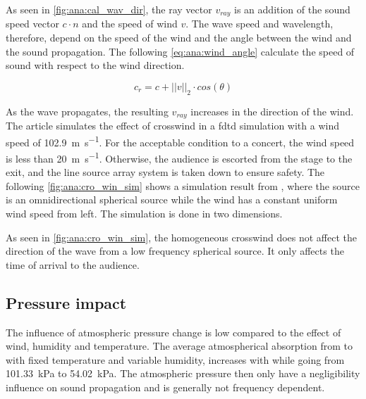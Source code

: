 As seen in \autoref{fig:ana:cal_wav_dir}, the ray vector $v_{ray}$ is an addition of the sound speed vector $c \cdot n$ and the speed of wind $v$. The wave speed and wavelength, therefore, depend on the speed of the wind and the angle between the wind and the sound propagation. The following \autoref{eq:ana:wind_angle} calculate the speed of sound with respect to the wind direction.




\begin{equation}\label{eq:ana:wind_angle}
c_r = c+||v||_2 \cdot cos(\theta) 
\end{equation}


\startexplain
{}
\stopexplain



As the wave propagates, the resulting $v_{ray}$ increases in the direction of the wind. The article \citep{crosswind_simulation} simulates the effect of crosswind in a \gls{fdtd} simulation with a wind speed of \SI{102.9}{\meter\per\second}. For the acceptable condition to a concert, the wind speed is less than \SI{20}{\meter\per\second}. Otherwise, the audience is escorted from the stage to the exit, and the line source array system is taken down to ensure safety. The following \autoref{fig:ana:cro_win_sim} shows a simulation result from \citep{crosswind_simulation}, where the source is an omnidirectional  spherical source while the wind has a constant uniform wind speed from left. The simulation is done in two dimensions.




As seen in \autoref{fig:ana:cro_win_sim}, the homogeneous crosswind does not affect the direction of the wave from a low frequency spherical source. It only affects the time of arrival to the audience.

\subsection{Pressure impact}\label{sub:sec:pre_imp}
The influence of atmospheric pressure change is low compared to the effect of wind, humidity and temperature. The average atmospherical absorption from  to  with fixed temperature and variable humidity, increases with  while going from \SI{101.33}{\kilo\pascal} to \SI{54.02}{\kilo\pascal}. The atmospheric pressure then only have a negligibility influence on sound propagation and is generally not frequency dependent. 


